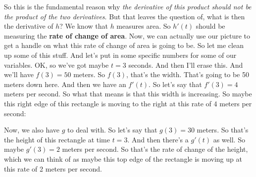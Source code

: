 \documentclass[pdftex, brazil, 12pt, twoside]{article}
\begin{document}
So this is the fundamental reason
why \emph{the derivative of this product
should not be the product of the two derivatives}.
But that leaves the question of, what
is then the derivative of $h$?
We know that $h$ measures area.
So $h'(t)$ should be measuring the \textbf{rate of change of area}.
Now, we can actually use our picture
to get a handle on what this rate of change of area
is going to be.
So let me clean up some of this stuff.
And let's put in some specific numbers
for some of our variables.
OK, so we've got maybe $t = 3$ seconds.
And then I'll erase this.
And we'll have $f(3) = 50$ meters.
So $f(3)$, that's the width.
That's going to be 50 meters down here.
And then we have an $f'(t)$.
So let's say that $f'(3) = 4$ meters per second.
So what that means is that this width is increasing.
So maybe this right edge of this rectangle
is moving to the right at this rate of 4 meters per second:

\begin{figure}[H]
  \begin{center}
  \end{center}
\end{figure}

Now, we also have $g$ to deal with.
So let's say that $g(3) = 30$ meters.
So that's the height of this rectangle at time $t = 3$.
And then there's a $g'(t)$ as well.
So maybe $g'(3) = 2$ meters per second.
So that's the rate of change of the height, which
we can think of as maybe this top edge of the rectangle
is moving up at this rate of 2 meters per second.
\end{document}
